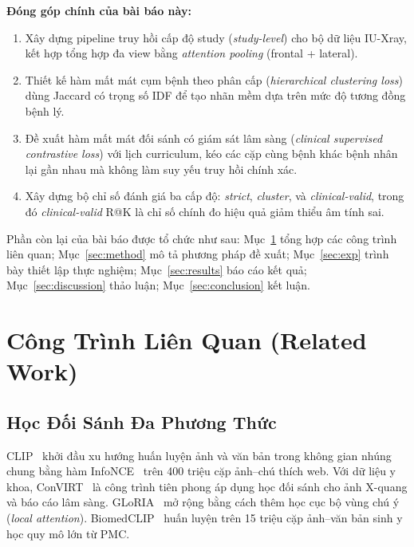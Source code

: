 \documentclass[12pt, a4paper]{article}
\begin{document}
\textbf{Đóng góp chính của bài báo này:}
\begin{enumerate}[label=(\roman*)]
  \item Xây dựng pipeline truy hồi cấp độ study (\textit{study-level})
    cho bộ dữ liệu IU-Xray, kết hợp tổng hợp đa view bằng
    \textit{attention pooling} (frontal + lateral).
  \item Thiết kế hàm mất mát cụm bệnh theo phân cấp
    (\textit{hierarchical clustering loss}) dùng Jaccard có trọng số IDF
    để tạo nhãn mềm dựa trên mức độ tương đồng bệnh lý.
  \item Đề xuất hàm mất mát đối sánh có giám sát lâm sàng
    (\textit{clinical supervised contrastive loss}) với lịch curriculum,
    kéo các cặp cùng bệnh khác bệnh nhân lại gần nhau mà không làm suy
    yếu truy hồi chính xác.
  \item Xây dựng bộ chỉ số đánh giá ba cấp độ: \textit{strict},
    \textit{cluster}, và \textit{clinical-valid}, trong đó
    \textit{clinical-valid} R@K là chỉ số chính đo hiệu quả giảm thiểu
    âm tính sai.
\end{enumerate}

Phần còn lại của bài báo được tổ chức như sau: Mục~\ref{sec:related} tổng hợp
các công trình liên quan; Mục~\ref{sec:method} mô tả phương pháp đề xuất;
Mục~\ref{sec:exp} trình bày thiết lập thực nghiệm; Mục~\ref{sec:results} báo
cáo kết quả; Mục~\ref{sec:discussion} thảo luận; Mục~\ref{sec:conclusion} kết
luận.

\section{Công Trình Liên Quan (Related Work)}
\label{sec:related}

\subsection{Học Đối Sánh Đa Phương Thức}

CLIP~\citep{radford2021learning} khởi đầu xu hướng huấn luyện ảnh và văn bản
trong không gian nhúng chung bằng hàm InfoNCE~\citep{oord2018representation} trên
400 triệu cặp ảnh--chú thích web. Với dữ liệu y khoa, ConVIRT~\citep{zhang2022contrastive}
là công trình tiên phong áp dụng học đối sánh cho ảnh X-quang và báo cáo lâm sàng.
GLoRIA~\citep{huang2021gloria} mở rộng bằng cách thêm học cục bộ vùng chú ý
(\textit{local attention}). BiomedCLIP~\citep{zhang2023biomedclip} huấn luyện
trên 15 triệu cặp ảnh--văn bản sinh y học quy mô lớn từ PMC.
\end{document}
